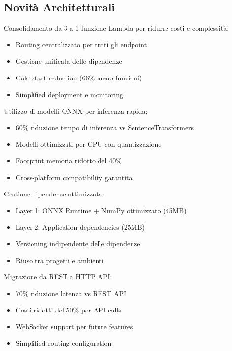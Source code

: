 \documentclass[11pt,a4paper]{article}
\begin{document}
\subsection{Novità Architetturali}
\begin{description}[style=nextline, leftmargin=0cm, itemsep=0.5em]
  \item[Single Lambda Function] Consolidamento da 3 a 1 funzione Lambda per ridurre costi e complessità:
    \begin{itemize}
      \item Routing centralizzato per tutti gli endpoint
      \item Gestione unificata delle dipendenze
      \item Cold start reduction (66\% meno funzioni)
      \item Simplified deployment e monitoring
    \end{itemize}
  
  \item[ONNX Model Optimization] Utilizzo di modelli ONNX per inferenza rapida:
    \begin{itemize}
      \item 60\% riduzione tempo di inferenza vs SentenceTransformers
      \item Modelli ottimizzati per CPU con quantizzazione
      \item Footprint memoria ridotto del 40\%
      \item Cross-platform compatibility garantita
    \end{itemize}
  
  \item[Lambda Layers Architecture] Gestione dipendenze ottimizzata:
    \begin{itemize}
      \item Layer 1: ONNX Runtime + NumPy ottimizzato (45MB)
      \item Layer 2: Application dependencies (25MB)
      \item Versioning indipendente delle dipendenze
      \item Riuso tra progetti e ambienti
    \end{itemize}
  
  \item[HTTP API Gateway] Migrazione da REST a HTTP API:
    \begin{itemize}
      \item 70\% riduzione latenza vs REST API
      \item Costi ridotti del 50\% per API calls
      \item WebSocket support per future features
      \item Simplified routing configuration
    \end{itemize}
  

\end{description}
\end{document}
